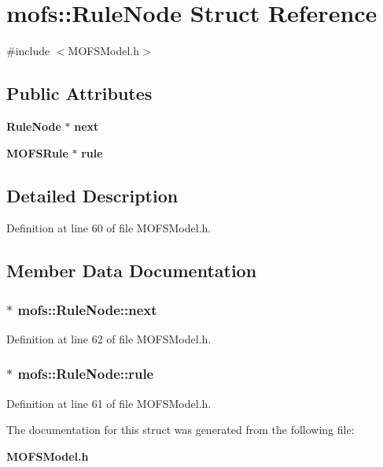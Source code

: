 \section{mofs\-:\-:Rule\-Node Struct Reference}
\label{structmofs_1_1RuleNode}


{\ttfamily \#include $<$M\-O\-F\-S\-Model.\-h$>$}

\subsection*{Public Attributes}
\begin{DoxyCompactItemize}
\item 
{\bf Rule\-Node} $\ast$ {\bf next}
\item 
{\bf M\-O\-F\-S\-Rule} $\ast$ {\bf rule}
\end{DoxyCompactItemize}


\subsection{Detailed Description}


Definition at line 60 of file M\-O\-F\-S\-Model.\-h.



\subsection{Member Data Documentation}
\subsubsection[{next}]{$\ast$ mofs\-::\-Rule\-Node\-::next}\label{structmofs_1_1RuleNode_a974ce31287addb178dff150228926c49}


Definition at line 62 of file M\-O\-F\-S\-Model.\-h.

\subsubsection[{rule}]{$\ast$ mofs\-::\-Rule\-Node\-::rule}\label{structmofs_1_1RuleNode_ac96e062d87b84ce7ca9b8ec2871bf25d}


Definition at line 61 of file M\-O\-F\-S\-Model.\-h.



The documentation for this struct was generated from the following file\-:\begin{DoxyCompactItemize}
\item 
{\bf M\-O\-F\-S\-Model.\-h}\end{DoxyCompactItemize}
